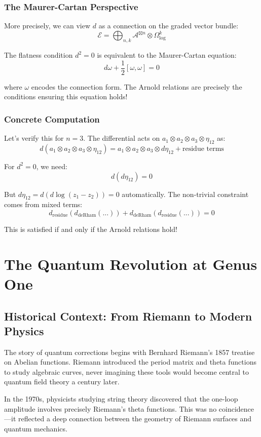 \subsubsection{The Maurer-Cartan Perspective}

More precisely, we can view $d$ as a connection on the graded vector bundle:
$$\mathcal{E} = \bigoplus_{n,k} \mathcal{A}^{\boxtimes n} \otimes \Omega^k_{\log}$$

The flatness condition $d^2 = 0$ is equivalent to the Maurer-Cartan equation:
$$d\omega + \frac{1}{2}[\omega, \omega] = 0$$

where $\omega$ encodes the connection form. The Arnold relations are precisely the conditions ensuring this equation holds!

\subsubsection{Concrete Computation}

Let's verify this for $n = 3$. The differential acts on $a_1 \otimes a_2 \otimes a_3 \otimes \eta_{12}$ as:
$$d(a_1 \otimes a_2 \otimes a_3 \otimes \eta_{12}) = a_1 \otimes a_2 \otimes a_3 \otimes d\eta_{12} + \text{residue terms}$$

For $d^2 = 0$, we need:
$$d(d\eta_{12}) = 0$$

But $d\eta_{12} = d(d\log(z_1 - z_2)) = 0$ automatically. The non-trivial constraint comes from mixed terms:
$$d_{\text{residue}}(d_{\text{deRham}}(...)) + d_{\text{deRham}}(d_{\text{residue}}(...)) = 0$$

This is satisfied if and only if the Arnold relations hold!

\section{The Quantum Revolution at Genus One}

\subsection{Historical Context: From Riemann to Modern Physics}

The story of quantum corrections begins with Bernhard Riemann's 1857 treatise on Abelian functions. Riemann introduced the period matrix and theta functions to study algebraic curves, never imagining these tools would become central to quantum field theory a century later.

In the 1970s, physicists studying string theory discovered that the one-loop amplitude involves precisely Riemann's theta functions. This was no coincidence—it reflected a deep connection between the geometry of Riemann surfaces and quantum mechanics.

